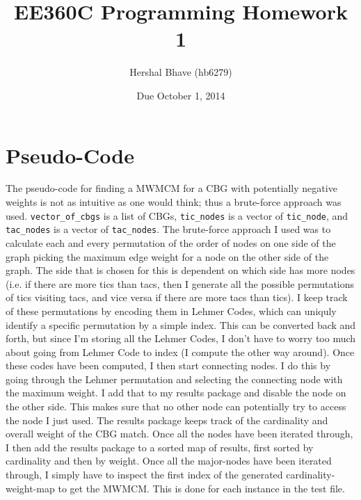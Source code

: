 \documentclass{article}
\title{EE360C Programming Homework 1}
\author{Hershal Bhave (hb6279)}
\date{Due October 1, 2014}
\begin{document}
\maketitle

\section{Pseudo-Code}
The pseudo-code for finding a MWMCM for a CBG with potentially
negative weights is not as intuitive as one would think; thus a
brute-force approach was used. \verb|vector_of_cbgs| is a list of
CBGs, \verb|tic_nodes| is a vector of \verb|tic_node|, and
\verb|tac_nodes| is a vector of \verb|tac_nodes|. The brute-force
approach I used was to calculate each and every permutation of the
order of nodes on one side of the graph picking the maximum edge
weight for a node on the other side of the graph. The side that is
chosen for this is dependent on which side has more nodes (i.e. if
there are more tics than tacs, then I generate all the possible
permutations of tics visiting tacs, and vice versa if there are more
tacs than tics). I keep track of these permutations by encoding them
in Lehmer Codes, which can uniquly identify a specific permutation by
a simple index. This can be converted back and forth, but since I'm
storing all the Lehmer Codes, I don't have to worry too much about
going from Lehmer Code to index (I compute the other way around). Once
these codes have been computed, I then start connecting nodes. I do
this by going through the Lehmer permutation and selecting the
connecting node with the maximum weight. I add that to my results
package and disable the node on the other side. This makes sure that
no other node can potentially try to access the node I just used. The
results package keeps track of the cardinality and overall weight of
the CBG match. Once all the nodes have been iterated through, I then
add the results package to a sorted map of results, first sorted by
cardinality and then by weight. Once all the major-nodes have been
iterated through, I simply have to inspect the first index of the
generated cardinality-weight-map to get the MWMCM. This is done for
each instance in the test file.
\end{document}
